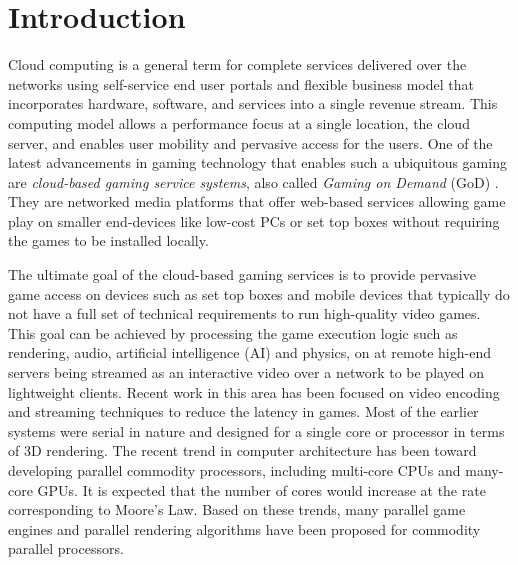 \documentclass[conference]{IEEEtran}
\begin{document}
    \section{Introduction}
    \label{sc:Introduction}
    Cloud computing is a general term for complete services delivered over the networks using self-service end user portals and flexible business model that incorporates hardware, software, and services into a single revenue stream.
    This computing model allows a performance focus at a single location, the cloud server, and enables user mobility and pervasive access for the users.
    One of the latest advancements in gaming technology that enables such a ubiquitous gaming are \emph{cloud-based gaming service systems}, also called \emph{Gaming on Demand} (GoD) \cite{Jurgelionis:2009}.
    They are networked media platforms that offer web-based services allowing game play on smaller end-devices like low-cost PCs or set top boxes without requiring the games to be installed locally.

    The ultimate goal of the cloud-based gaming services is to provide pervasive game access on devices such as set top boxes and mobile devices that typically do not have a full set of technical requirements to run high-quality video games.
    This goal can be achieved by processing the game execution logic such as rendering, audio, artificial intelligence (AI) and physics, on at remote high-end servers
    being streamed as an interactive video over a network to be played on lightweight clients.
    Recent work in this area has been focused on video encoding and streaming techniques to reduce the latency in games.
    Most of the earlier systems were serial in nature and designed for a single core or processor in terms of 3D rendering.
     The recent trend in computer architecture has been toward developing parallel commodity processors, including multi-core CPUs and many-core GPUs.
    It is expected that the number of cores would increase at the rate corresponding to Moore's Law.
    Based on these trends, many parallel game engines \cite{Smoke:2009} and parallel rendering algorithms \cite{Humphreys:2002}\cite{Eilemann:2009} have been proposed for commodity parallel processors.
\end{document}
